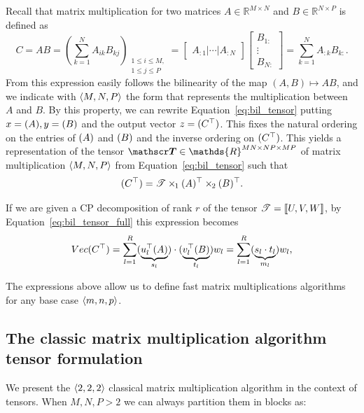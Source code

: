 \documentclass[a4paper, leqno, 11pt]{article}
\renewcommand{\mathbb}[1]{\mathds{#1}}
\newcommand{\R}{\mathbb{R}}
\let\Vec\relax
\DeclareMathOperator{\Vec}{vec}
\theoremstyle{definition}
\theoremstyle{remark}
\theoremstyle{experimental}
\begin{document}
Recall that matrix multiplication for two matrices $ A \in \R^{M\times N} $ and $ B
\in \R^{N\times P} $ is defined as
\begin{equation*}
  C = AB = \left(\sum_{k=1}^N A_{ik}B_{kj}\right)_{\substack{1\le i\le M, \\ 1\le j\le P}} =
  \begin{bmatrix}  A_{:1} | \cdots | A_{:N} \end{bmatrix} \begin{bmatrix} B_{1:} \\ \vdots \\ B_{N:}
\end{bmatrix} = \sum_{k=1}^N A_{:k}B_{k:}.
\end{equation*}
From this expression easily follows the bilinearity of the map $ (A,B) \mapsto AB $, 
and we indicate with $ \angb{M,N,P} $ the form that represents the multiplication between $ A $
and $ B $. By this property, we can rewrite Equation~\ref{eq:bil_tensor} putting $ x =
\Vec(A),y=\Vec(B) $ and the output vector $ z = \Vec(C^{\top}) $. This fixes the natural
ordering on the entries of $ \Vec(A) $ and $ \Vec(B) $ and the inverse ordering on $
\Vec(C^\top)$. This
yields a representation of the tensor $ \Tn{T} \in \R^{MN\times NP\times MP} $ of matrix
multiplication $ \angb{M,N,P} $ from Equation~\ref{eq:bil_tensor} such that
\begin{equation}
  \label{eq:mulvec}
\Vec(C^\top) = \Tn{T} \ttm[1] \Vec(A)^{\top} \ttm[2] \Vec(B)^{\top}
.\end{equation}

If we are given a CP decomposition of rank $ r $ of the tensor $ \Tn{T}  = \dsqr{U,V,W}$, by
Equation~\ref{eq:bil_tensor_full} this expression becomes
\begin{equation}
  \label{eq:mulvec:CP}
  Vec(C^\top) = \sum_{l=1}^R (\underbrace{u_l^\top \Vec(A)}_{s_l}) \cdot
  (\underbrace{v_l^\top\Vec(B)}_{t_l})w_l = \sum_{l=1}^R (\underbrace{s_l \cdot
  t_l}_{m_l})w_l,
\end{equation}

The expressions above allow us to define fast matrix multiplications algorithms for any base case $ \angb{m,n,p} $.

\subsection{The classic matrix multiplication algorithm tensor formulation}

We present the $ \angb{2,2,2} $ classical matrix multiplication algorithm in the context of tensors.
When $ M,N,P>2 $ we can always partition them in blocks as:
\end{document}
